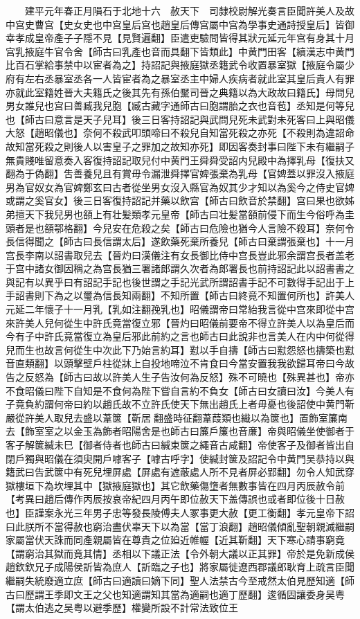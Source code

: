 　　建平元年春正月隕石于北地十六　赦天下　司隸校尉解光奏言臣聞許美人及故中宫史曹宫【史女史也中宫皇后宫也趙皇后傳宫屬中宫為學事史通詩授皇后】皆御幸孝成皇帝產子子隱不見【見賢遍翻】臣遣吏驗問皆得其狀元延元年宫有身其十月宫乳掖庭牛官令舍【師古曰乳產也音而具翻下皆類此】中黄門田客【續漢志中黄門比百石掌給事禁中以宦者為之】持詔記與掖庭獄丞籍武令收置暴室獄【掖庭令屬少府有左右丞暴室丞各一人皆宦者為之暴室丞主中婦人疾病者就此室其皇后貴人有罪亦就此室籍姓晉大夫籍氏之後其先有孫伯黶司晉之典籍以為大政故曰籍氏】母問兒男女誰兒也宫曰善臧我兒胞【臧古藏字通師古曰胞謂胎之衣也音苞】丞知是何等兒也【師古曰意言是天子兒耳】後三日客持詔記與武問兒死未武對未死客曰上與昭儀大怒【趙昭儀也】奈何不殺武叩頭啼曰不殺兒自知當死殺之亦死【不殺則為違詔命故知當死殺之則後人以害皇子之罪加之故知亦死】即因客奏封事曰陛下未有繼嗣子無貴賤唯留意奏入客復持詔記取兒付中黄門王舜舜受詔内兒殿中為擇乳母【復扶又翻為于偽翻】吿善養兒且有賞毋令漏泄舜擇官婢張棄為乳母【官婢蓋以罪沒入掖庭男為官奴女為官婢鄭玄曰古者從坐男女沒入縣官為奴其少才知以為奚今之侍史官婢或謂之奚官女】後三日客復持詔記并藥以飲宫【師古曰飲音於禁翻】宫曰果也欲姊弟擅天下我兒男也頟上有壮髪類孝元皇帝【師古曰壮髪當頟前侵下而生今俗呼為圭頭者是也頟鄂格翻】今兒安在危殺之矣【師古曰危險也猶今人言險不殺耳】奈何令長信得聞之【師古曰長信謂太后】遂飲藥死棄所養兒【師古曰棄謂張棄也】十一月宫長李南以詔書取兒去【晉灼曰漢儀注有女長御比侍中宫長豈此邪余謂宫長者盖老于宫中諸女御因稱之為宫長猶三署諸郎謂久次者為郎署長也前持詔記此以詔書書之與記有以異乎曰有詔記手記也後世謂之手記光武所謂詔書手記不可數得手記出于上手詔書則下為之以璽為信長知兩翻】不知所置【師古曰終竟不知置何所也】許美人元延二年懷子十一月乳【乳如注翻㝃乳也】昭儀謂帝曰常紿我言從中宫來即從中宫來許美人兒何從生中許氏竟當復立邪【晉灼曰昭儀前要帝不得立許美人以為皇后而今有子中許氏竟當復立為皇后邪此前約之言也師古曰此說非也言美人在内中何從得兒而生也故言何從生中次此下乃始言約耳】懟以手自擣【師古曰懟怨怒也擣築也懟音直類翻】以頭擊壁戶柱從牀上自投地啼泣不肯食曰今當安置我我欲歸耳帝曰今故告之反怒為【師古曰故以許美人生子告汝何為反怒】殊不可曉也【殊異甚也】帝亦不食昭儀曰陛下自知是不食何為陛下嘗自言約不負女【師古曰女讀曰汝】今美人有子竟負約謂何帝曰約以趙氏故不立許氏使天下無出趙氏上者毋憂也後詔使中黄門靳嚴從許美人取兒去盛以葦箧【靳居翻盛時征翻葦葭類也織以為箧也】置飾室簾南去【飾室室之以金玉為飾者昭陽舍是也師古曰簾戶簾也音亷】帝與昭儀坐使御者于客子解箧緘未巳【御者侍者也師古曰緘束箧之繩音古咸翻】帝使客子及御者皆出自閉戶獨與昭儀在須臾開戶嘑客子【嘑古呼字】使緘封箧及詔記令中黄門吴恭持以與籍武曰告武箧中有死兒埋屏處【屏處有遮蔽處人所不見者屏必郢翻】勿令人知武穿獄樓垣下為坎埋其中【獄掖庭獄也】其它飲藥傷墯者無數事皆在四月丙辰赦令前　【考異曰趙后傳作丙辰按哀帝紀四月丙午即位赦天下盖傳誤也或者即位後十日赦也】臣謹案永光三年男子忠等發長陵傅夫人冢事更大赦【更工衡翻】孝元皇帝下詔曰此朕所不當得赦也窮治盡伏辜天下以為當【當丁浪翻】趙昭儀傾亂聖朝親滅繼嗣家屬當伏天誅而同產親屬皆在尊貴之位廹近帷幄【近其靳翻】天下寒心請事窮竟【謂窮治其獄而竟其情】丞相以下議正法【令外朝大議以正其罪】帝於是免新成侯趙欽欽兄子成陽侯訢皆為庶人【訢臨之子也】將家屬徙遼西郡議郎耿育上疏言臣聞繼嗣失統廢適立庶【師古曰適讀曰嫡下同】聖人法禁古今至戒然太伯見歷知適【師古曰歷謂王季即文王之父也知適謂知其當為適嗣也適丁歷翻】逡循固讓委身吴粤【謂太伯逃之吴粤以避季歷】權變所設不計常法致位王